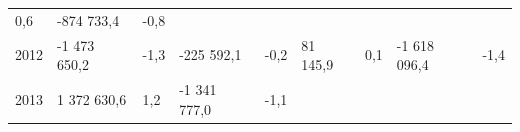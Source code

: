 \begin{longtable}[]{@{}lllllllll@{}}
\begin{minipage}[t]{0.06\columnwidth}
0,6\strut
\end{minipage} & \begin{minipage}[t]{0.10\columnwidth}\raggedright
-874 733,4\strut
\end{minipage} & \begin{minipage}[t]{0.06\columnwidth}\raggedright
-0,8\strut
\end{minipage}\tabularnewline
\begin{minipage}[t]{0.05\columnwidth}\raggedright
2012\strut
\end{minipage} & \begin{minipage}[t]{0.10\columnwidth}\raggedright
-1 473 650,2\strut
\end{minipage} & \begin{minipage}[t]{0.06\columnwidth}\raggedright
-1,3\strut
\end{minipage} & \begin{minipage}[t]{0.16\columnwidth}\raggedright
-225 592,1\strut
\end{minipage} & \begin{minipage}[t]{0.06\columnwidth}\raggedright
-0,2\strut
\end{minipage} & \begin{minipage}[t]{0.12\columnwidth}\raggedright
81 145,9\strut
\end{minipage} & \begin{minipage}[t]{0.06\columnwidth}\raggedright
0,1\strut
\end{minipage} & \begin{minipage}[t]{0.10\columnwidth}\raggedright
-1 618 096,4\strut
\end{minipage} & \begin{minipage}[t]{0.06\columnwidth}\raggedright
-1,4\strut
\end{minipage}\tabularnewline
\begin{minipage}[t]{0.05\columnwidth}\raggedright
2013\strut
\end{minipage} & \begin{minipage}[t]{0.10\columnwidth}\raggedright
1 372 630,6\strut
\end{minipage} & \begin{minipage}[t]{0.06\columnwidth}\raggedright
1,2\strut
\end{minipage} & \begin{minipage}[t]{0.16\columnwidth}\raggedright
-1 341 777,0\strut
\end{minipage} & \begin{minipage}[t]{0.06\columnwidth}\raggedright
-1,1\strut

\end{minipage}
\end{longtable}
